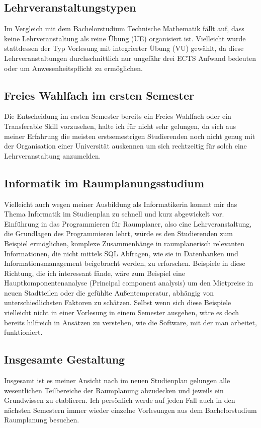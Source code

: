 \documentclass[]{article}
\begin{document}
\subsection{Lehrveranstaltungstypen}
Im Vergleich mit dem Bachelorstudium Technische Mathematik fällt auf, dass keine Lehrveranstaltung als reine Übung (UE) organisiert ist. Vielleicht wurde stattdessen der Typ Vorlesung mit integrierter Übung (VU) gewählt, da diese Lehrveranstaltungen durchschnittlich nur ungefähr drei ECTS Aufwand bedeuten oder um Anwesenheitspflicht zu ermöglichen.

\subsection{Freies Wahlfach im ersten Semester}
Die Entscheidung im ersten Semester bereits ein Freies Wahlfach oder ein Transferable Skill vorzusehen, halte ich für nicht sehr gelungen, da sich aus meiner Erfahrung die meisten erstsemestrigen Studierenden noch nicht genug mit der Organisation einer Universität auskennen um sich rechtzeitig für solch eine Lehrveranstaltung anzumelden.

\subsection{Informatik im Raumplanungsstudium}
Vielleicht auch wegen meiner Ausbildung als Informatikerin kommt mir das Thema Informatik im Studienplan zu schnell und kurz abgewickelt vor. Einführung in das Programmieren für Raumplaner, also eine Lehrveranstaltung, die Grundlagen des Programmieren lehrt, würde es den Studierenden zum Beispiel ermöglichen, komplexe Zusammenhänge in raumplanerisch relevanten Informationen, die nicht mittels SQL Abfragen, wie sie in Datenbanken und Informationsmanagement beigebracht werden, zu erforschen. Beispiele in diese Richtung, die ich interessant fände, wäre zum Beispiel eine Hauptkomponentenanalyse (Principal component analysis) um den Mietpreise in neuen Stadtteilen oder die gefühlte Außentemperatur, abhängig von unterschiedlichsten Faktoren zu schätzen. Selbst wenn sich diese Beispiele vielleicht nicht in einer Vorlesung in einem Semester ausgehen, wäre es doch bereits hilfreich in Ansätzen zu verstehen, wie die Software, mit der man arbeitet, funktioniert.

\subsection{Insgesamte Gestaltung}
Insgesamt ist es meiner Ansicht nach im neuen Studienplan gelungen alle wesentlichen Teilbereiche der Raumplanung abzudecken und jeweils ein Grundwissen zu etablieren. Ich persönlich werde auf jeden Fall auch in den nächsten Semestern immer wieder einzelne Vorlesungen aus dem Bachelorstudium Raumplanung besuchen.

 

\end{document}

